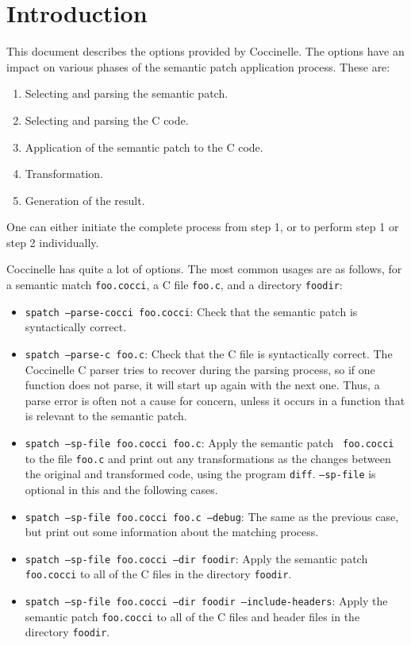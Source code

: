 \section{Introduction}

This document describes the options provided by Coccinelle.  The options
have an impact on various phases of the semantic patch application
process.  These are:

\begin{enumerate}
\item Selecting and parsing the semantic patch.
\item Selecting and parsing the C code.
\item Application of the semantic patch to the C code.
\item Transformation.
\item Generation of the result.
\end{enumerate}

\noindent
One can either initiate the complete process from step 1, or
to perform step 1 or step 2 individually.

Coccinelle has quite a lot of options.  The most common usages are as
follows, for a semantic match {\tt foo.cocci}, a C file {\tt foo.c}, and a
directory {\tt foodir}:

\begin{itemize}
\item {\tt spatch --parse-cocci foo.cocci}: Check that the semantic patch
  is syntactically correct.
\item {\tt spatch --parse-c foo.c}: Check that the C file
  is syntactically correct.  The Coccinelle C parser tries to recover
  during the parsing process, so if one function does not parse, it will
  start up again with the next one.  Thus, a parse error is often not a
  cause for concern, unless it occurs in a function that is relevant to the
  semantic patch.
\item {\tt spatch --sp-file foo.cocci foo.c}: Apply the semantic patch {\tt
    foo.cocci} to the file {\tt foo.c} and print out any transformations as
  the changes between the original and transformed code, using the program
  {\tt diff}.  {\tt --sp-file} is optional in this and the following cases.
\item {\tt spatch --sp-file foo.cocci foo.c --debug}:  The same as the
  previous case, but print out some information about the matching process.
\item {\tt spatch --sp-file foo.cocci --dir foodir}:  Apply the semantic
  patch {\tt foo.cocci} to all of the C files in the directory {\tt foodir}.
\item {\tt spatch --sp-file foo.cocci --dir foodir --include-headers}:  Apply
  the semantic patch {\tt foo.cocci} to all of the C files and header files
  in the directory {\tt foodir}. 
\end{itemize}

